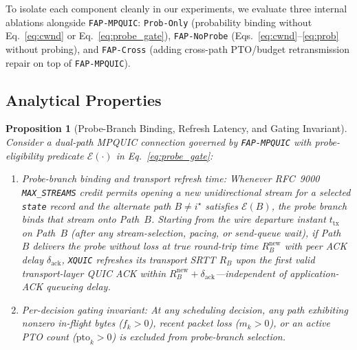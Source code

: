 \documentclass[preprint,12pt,number]{elsarticle}
\newtheorem{proposition}{Proposition}
\begin{document}
To isolate each component cleanly in our experiments, we evaluate three internal ablations alongside \texttt{FAP-MPQUIC}: \texttt{Prob-Only} (probability binding without Eq.~\eqref{eq:cwnd} or Eq.~\eqref{eq:probe_gate}), \texttt{FAP-NoProbe} (Eqs.~\eqref{eq:cwnd}--\eqref{eq:prob} without probing), and \texttt{FAP-Cross} (adding cross-path PTO/budget retransmission repair on top of \texttt{FAP-MPQUIC}).

\subsection{Analytical Properties}
\begin{proposition}[Probe-Branch Binding, Refresh Latency, and Gating Invariant]
\label{prop:fap}
Consider a dual-path MPQUIC connection governed by \texttt{FAP-MPQUIC} with probe-eligibility predicate $\mathcal{E}(\cdot)$ in Eq.~\eqref{eq:probe_gate}:
\begin{enumerate}
    \item[(i)] \emph{Probe-branch binding and transport refresh time:} Whenever RFC~9000 \texttt{MAX\_STREAMS} credit permits opening a new unidirectional stream for a selected \texttt{state} record and the alternate path $B \neq i^\star$ satisfies $\mathcal{E}(B)$, the probe branch binds that stream onto Path~$B$. Starting from the wire departure instant $t_{\text{tx}}$ on Path~$B$ (after any stream-selection, pacing, or send-queue wait), if Path~$B$ delivers the probe without loss at true round-trip time $R_B^{\text{new}}$ with peer ACK delay $\delta_{\text{ack}}$, \texttt{XQUIC} refreshes its transport SRTT $R_B$ upon the first valid transport-layer QUIC ACK within $R_B^{\text{new}} + \delta_{\text{ack}}$---independent of application-ACK queueing delay.
    \item[(ii)] \emph{Per-decision gating invariant:} At any scheduling decision, any path exhibiting nonzero in-flight bytes ($f_k > 0$), recent packet loss ($m_k > 0$), or an active PTO count ($\text{pto}_k > 0$) is excluded from probe-branch selection.
\end{enumerate}
\end{proposition}
\end{document}
